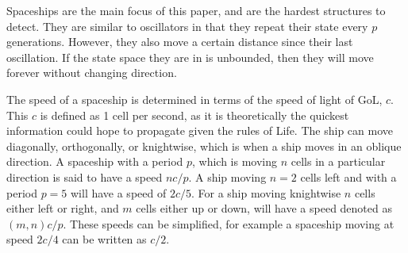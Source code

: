\documentclass{l4proj}
\begin{document}
Spaceships are the main focus of this paper, and are the hardest structures to detect. They are similar to oscillators in that they repeat their state every $p$ generations. However, they also move a certain distance since their last oscillation. If the state space they are in is unbounded, then they will move forever without changing direction.

The speed of a spaceship is determined in terms of the speed of light of GoL, $c$. This $c$ is defined as 1 cell per second, as it is theoretically the quickest information could hope to propagate given the rules of Life. The ship can move diagonally, orthogonally, or knightwise, which is when a ship moves in an oblique direction. A spaceship with a period $p$, which is moving $n$ cells in a particular direction is said to have a speed $nc/p$. A ship moving $n = 2$ cells left and with a period $p = 5$ will have a speed of $2c/5$. For a ship moving knightwise $n$ cells either left or right, and $m$ cells either up or down, will have a speed denoted as $(m, n)c/p$. These speeds can be simplified, for example a spaceship moving at speed $2c/4$ can be written as $c/2$.
\end{document}
